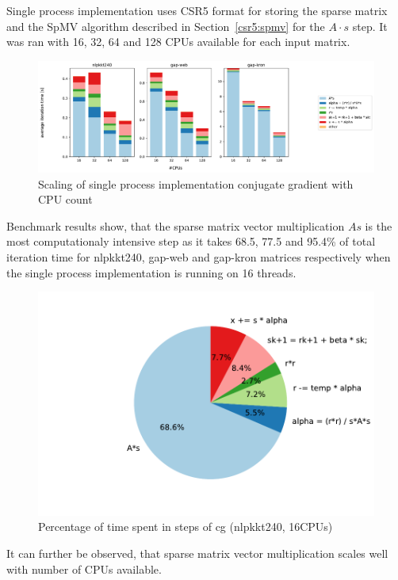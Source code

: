 \documentclass[thesis=M,english]{FITthesis}[2019/12/23]
\begin{document}
Single process implementation uses CSR5 format for storing the sparse matrix and the
SpMV algorithm  described in Section~\ref{csr5:spmv} for the \(A \cdot s\) step. It was ran
with 16, 32, 64 and 128 CPUs available for each input matrix.

\begin{figure}[htp]
    \centering
    \includegraphics[scale=0.35]{static/single_process.pdf}
    \caption{Scaling of single process implementation conjugate gradient with CPU count}
\end{figure}

Benchmark results show, that the sparse matrix vector multiplication
\(As\) is the most computationaly intensive step as it takes 68.5, 77.5 and 95.4\% of
total iteration time for nlpkkt240, gap-web and gap-kron matrices respectively when
the single process implementation is running on 16 threads.


\begin{figure}[htp]
    \centering
    \includegraphics[scale=0.6]{static/cg_sp_nlpkkt240_16.pdf}
    \caption{Percentage of time spent in steps of cg (nlpkkt240, 16CPUs)}
\end{figure}


It can further be observed, that sparse matrix vector multiplication scales well with
number of CPUs available.
\end{document}
